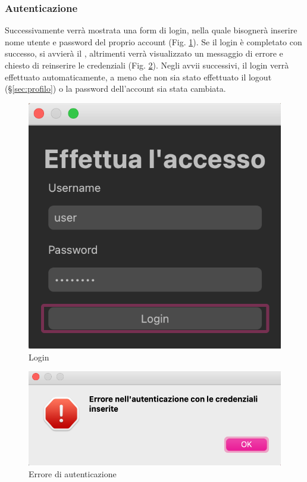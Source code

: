 \subsubsection{Autenticazione}
\label{sec:autenticazione}
Successivamente verrà mostrata una form di login, nella quale bisognerà inserire nome utente e password del proprio account  (Fig. \ref{fig:Vista del login}).
Se il login è completato con successo, si avvierà il , altrimenti verrà visualizzato un messaggio di errore e chiesto di reinserire le credenziali (Fig. \ref{fig:errore login}). \newline
Negli avvii successivi, il login verrà effettuato automaticamente, a meno che non sia stato effettuato il logout (\S{}\ref{sec:profilo}) o la password dell'account sia stata cambiata.
\begin{figure}[H]
    \centering
    \includegraphics[scale = 0.50]{components/img/login.png}
    \caption{Login}
    \label{fig:Vista del login}
\end{figure}
\begin{figure}[H]
    \centering
    \includegraphics[scale = 0.50]{components/img/err-login.png}
    \caption{Errore di autenticazione}
    \label{fig:errore login}
\end{figure}


